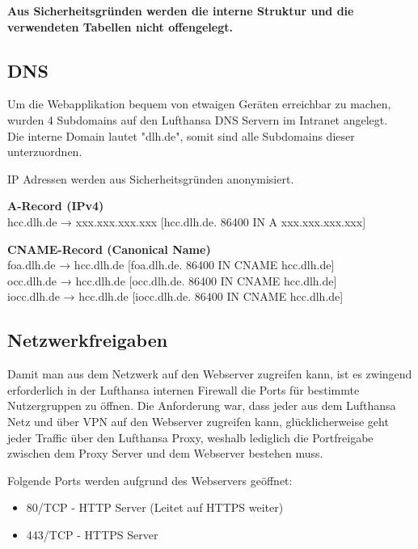 	{
		\noindent
		\textbf{Aus Sicherheitsgründen werden die interne Struktur und die verwendeten Tabellen nicht offengelegt.}
	}

	\subsection{DNS}

	{
		\noindent
		Um die Webapplikation bequem von etwaigen Geräten erreichbar zu machen, wurden 4 Subdomains auf den Lufthansa DNS Servern im Intranet angelegt.\\
		Die interne Domain lautet "dlh.de", somit sind alle Subdomains dieser unterzuordnen.	
	}

	{
		\noindent
		IP Adressen werden aus Sicherheitsgründen anonymisiert.
	}
	
	\vspace{16pt}

	{
		\noindent
		\textbf{A-Record (IPv4)}\\
		hcc.dlh.de → xxx.xxx.xxx.xxx [hcc.dlh.de. 86400 IN A xxx.xxx.xxx.xxx]
	}

	\vspace{8pt}

	{
		\noindent
		\textbf{CNAME-Record (Canonical Name)}\\
		foa.dlh.de → hcc.dlh.de [foa.dlh.de. 86400 IN CNAME hcc.dlh.de]\\
		occ.dlh.de → hcc.dlh.de [occ.dlh.de. 86400 IN CNAME hcc.dlh.de]\\
		iocc.dlh.de → hcc.dlh.de [iocc.dlh.de. 86400 IN CNAME hcc.dlh.de]
	}
	

	

	\subsection{Netzwerkfreigaben}
	Damit man aus dem Netzwerk auf den Webserver zugreifen kann, ist es zwingend erforderlich in der Lufthansa internen Firewall die Ports für bestimmte Nutzergruppen zu öffnen.
	Die Anforderung war, dass jeder aus dem Lufthansa Netz und über VPN auf den Webserver zugreifen kann, glücklicherweise geht jeder Traffic über den Lufthansa Proxy, weshalb lediglich die Portfreigabe zwischen dem Proxy Server und dem Webserver bestehen muss.
	
	Folgende Ports werden aufgrund des Webservers geöffnet:

	\begin{itemize}
		\item 80/TCP - HTTP Server (Leitet auf HTTPS weiter)
		\item 443/TCP - HTTPS Server
	\end{itemize}